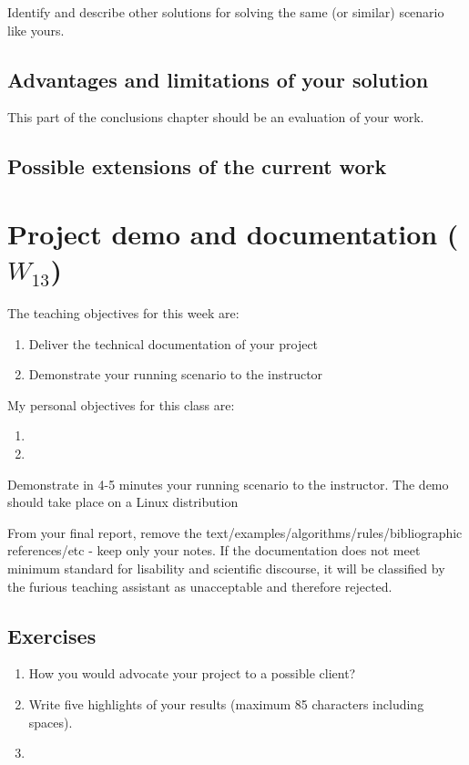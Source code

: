 \documentclass[a4paper,12pt]{report}
\begin{document}
Identify and describe other solutions for solving the same (or similar) scenario like yours.

\section{Advantages and limitations of your solution}
This part of the conclusions chapter should be an evaluation of your work. 


\section{Possible extensions of the current work}






\chapter{Project demo and documentation ($W_{13}$)}

The teaching objectives for this week are:
\begin{enumerate}
\item Deliver the technical documentation of your project
\item Demonstrate your running scenario to the instructor
\end{enumerate}

\vspace{0.5cm}

My personal objectives for this class are:
\begin{enumerate}
 \item 
 \item 
\end{enumerate}


Demonstrate in 4-5 minutes your running scenario to the instructor. 
The demo should take place on a Linux distribution


From your final report, remove the text/examples/algorithms/rules/bibliographic references/etc - keep only your notes. 
If the documentation does not meet minimum standard for lisability and scientific discourse, 
it will be classified by the furious teaching assistant as unacceptable and therefore rejected.




\section{Exercises}
\begin{enumerate}
 \item How you would advocate your project to a possible client?
 \item Write five highlights of your results (maximum 85 characters including spaces).
 \item 
\end{enumerate}
\end{document}
